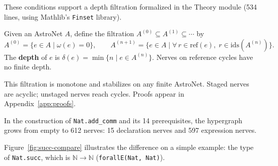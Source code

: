 These conditions support a depth filtration formalized in the Theory module (534 lines, using Mathlib's \texttt{Finset} library).

\begin{definition}
Given an AstroNet $A$, define the filtration $A^{(0)} \subseteq A^{(1)} \subseteq \cdots$ by
\[
  A^{(0)} = \{ e \in A \mid \omega(e) = 0 \}, \qquad
  A^{(n+1)} = \{ e \in A \mid \forall\, r \in \mathrm{ref}(e),\; r \in \mathrm{ids}(A^{(n)}) \}.
\]
The \textbf{depth} of $e$ is $\delta(e) = \min\{n \mid e \in A^{(n)}\}$.  Nerves on reference cycles have no finite depth.
\end{definition}

This filtration is monotone and stabilizes on any finite AstroNet.  Staged nerves are acyclic; unstaged nerves reach cycles.  Proofs appear in Appendix~\ref{app:proofs}.

In the construction of \texttt{Nat.add\_comm} and its 14 prerequisites, the hypergraph grows from empty to 612 nerves: 15 declaration nerves and 597 expression nerves.

Figure~\ref{fig:succ-compare} illustrates the difference on a simple example: the type of \texttt{Nat.succ}, which is $\mathbb{N} \to \mathbb{N}$ (\texttt{forallE(Nat, Nat)}).

